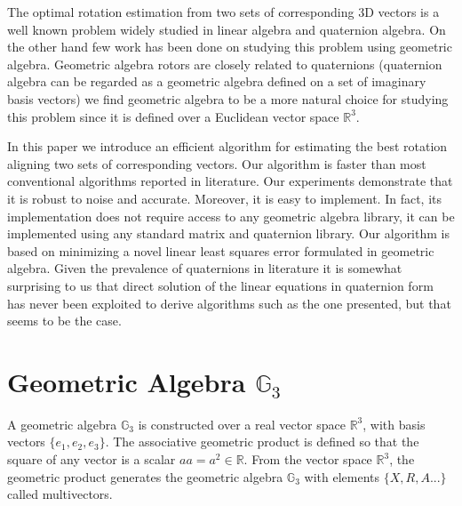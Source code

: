 \documentclass{birkjour}
\numberwithin{equation}{section}
\begin{document}
The optimal rotation estimation from two sets of corresponding 3D vectors is a well known problem widely studied in linear algebra and quaternion algebra. On the other hand few work has been done on studying this problem using geometric algebra. Geometric algebra rotors are closely related to quaternions (quaternion algebra can be regarded as a geometric algebra defined on a set of imaginary basis vectors) we find geometric algebra to be a more natural choice for studying this problem since it is defined over a Euclidean vector space $\mathbb R^3$.

In this paper we introduce an efficient algorithm for estimating the best rotation aligning two sets of corresponding vectors. Our algorithm is faster than most conventional algorithms reported in literature. Our experiments demonstrate that it is robust to noise and accurate. Moreover, it is easy to implement. In fact, its implementation does not require access to any geometric algebra library, it can be implemented using any standard matrix and quaternion library. Our algorithm is based on minimizing a novel linear least squares error formulated in geometric algebra. Given the prevalence of quaternions in literature it is somewhat surprising to us that direct solution of the linear equations in quaternion form has never been exploited to derive algorithms such as the one presented, but that seems to be the case.


\section{Geometric Algebra $\mathbb{G}_3$}

A geometric algebra $\mathbb{G}_3$ is constructed over a real vector space $\mathbb R^3$, with basis vectors $\{e_1, e_2, e_3\}$. The associative geometric product is defined so that the square of any vector is a scalar $a a = a^2 \in \mathbb{R}$. From the vector space $\mathbb R^3$, the geometric product generates the geometric algebra $\mathbb{G}_3$ with elements $\{ X, R, A...\}$ called multivectors.
\end{document}
